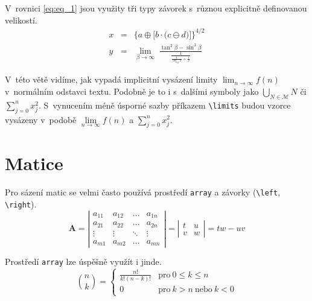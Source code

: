 \documentclass[twocolumn, 11pt, a4paper, titlepage]{article}
\theoremstyle{definition}
\begin{document}
V~rovnici \eqref{eq:eq_1} jsou využity tři typy závorek s~různou explicitně definovanou velikostí.
\begin{eqnarray}
x & = & \bigg\{a \oplus \Big[b \cdot \big(c \ominus d\big)\Big]\bigg\}^{4/2} \label{eq:eq_1} \\ 
y & = & \underset{\beta \to \infty}{\lim}\;\frac{\tan^2{\beta} - \sin^3{\beta}}{\frac{1}{\frac{1}{\log_{42} x} + \frac{1}{2}}} \label{eq:eq_2}
\end{eqnarray}

V~této větě vidíme, jak vypadá implicitní vysázení limity $\lim_{n \to \infty} f(n)$ v~normálním odstavci textu. Podobně je to i s~dalšími symboly jako $\bigcup_{N \in \mathcal{M}} N$ či $\sum_{j=0}^n x^2_j$. 
S~vynucením méně úsporné sazby příkazem \verb|\limits| budou vzorce vysázeny v~podobě $\lim\limits_{n \to \infty} f(n)$ a $\sum\limits_{j=0}^n x^2_j$. 

\section{Matice}
Pro sázení matic se velmi často používá prostředí \verb|array| a závorky (\verb|\left|, \verb|\right|). 
\[
\mathbf{A} = \left|\begin{array}{cccc}
     a_{11} & a_{12} & \dotsc & a_{1n}  \\
     a_{21} & a_{22} & \dotsc & a_{2n}  \\
     \vdots & \vdots & \ddots & \vdots  \\
     a_{m1} & a_{m2} & \dotsc & a_{mn}
\end{array} \right| =
\left|\begin{array}{cc}
t & u\\
v & w
\end{array} \right| = tw - uv 
\]

Prostředí \verb|array| lze úspěšně využít i jinde.
\[
\binom{n}{k}
=
\left\{
\begin{array}{cl}
    \frac{n!}{k!(n-k)!} & \text{pro}\ 0 \leq k \leq n \\
    0 & \text{pro}\ k > n\ \text{nebo}\ k < 0 
\end{array}
\right.
\]
\end{document}
